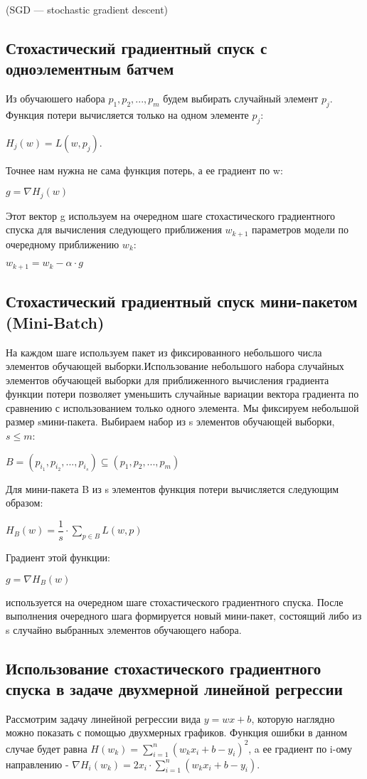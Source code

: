 \documentclass{article}
\begin{document}
\noindent (SGD — stochastic gradient descent)
\subsection*{Стохастический градиентный спуск с одноэлементным батчем}
Из обучаюшего набора $p_1, p_2, ..., p_m$ будем выбирать случайный элемент $p_j$. Функция потери вычисляется только на одном элементе $p_j$: 
\begin{center}
    $H_j(w) = L(w, p_j)$. 
\end{center}
Точнее нам нужна не сама функция потерь, а ее градиент по w:
\begin{center}
    $g = \nabla H_j(w)$
\end{center}
Этот вектор g используем на очередном шаге стохастического градиентного спуска для вычисления следующего приближения $w_{k + 1}$
параметров модели по очередному приближению $w_k$:
\begin{center}
    $w_{k + 1} = w_k - \alpha \cdot g$
\end{center}
\subsection*{Стохастический градиентный спуск мини-пакетом (Mini-Batch)}
На каждом шаге используем пакет из фиксированного небольшого числа элементов обучающей выборки.Использование небольшого набора случайных элементов обучающей выборки для приближенного вычисления градиента функции потери позволяет уменьшить случайные вариации вектора градиента по сравнению с использованием только одного элемента. Мы фиксируем небольшой размер sмини-пакета. Выбираем набор из s
элементов обучающей выборки, $s \le m$:
\begin{center}
    $B = (p_{i_1}, p_{i_2}, ..., p_{i_s}) \subseteq (p_1, p_2, ..., p_m)$
\end{center}
Для мини-пакета B из s элементов функция потери вычисляется следующим образом: 
\begin{center}
    $H_B(w) = \dfrac{1}{s} \cdot \displaystyle \sum_{p \in B} L(w, p)$
\end{center}
Градиент этой функции:
\begin{center}
    $g = \nabla H_B(w)$
\end{center}
используется на очередном шаге стохастического градиентного спуска. После выполнения очередного шага формируется новый мини-пакет, состоящий либо из s случайно выбранных элементов обучающего набора.
\subsection*{Использование стохастического градиентного спуска в задаче двухмерной линейной регрессии}
Рассмотрим задачу линейной регрессии вида $y = wx + b$, которую наглядно можно показать с помощью двухмерных графиков. Функция ошибки в данном случае будет равна $H(w_k) = \displaystyle \sum_{i=1}^{n}(w_kx_i + b - y_i)^2$, a ее градиент по i-ому направлению - $\nabla H_i(w_k) = 2x_i \cdot \displaystyle \sum_{i=1}^{n}{(w_kx_i + b - y_i)}$. \\
\end{document}
